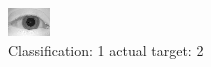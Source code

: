 \begin{figure}[h!]
\begin{center}
\includegraphics[width=0.60\columnwidth]{figures/ID1011_class_1_target_2.png}
\end{center}
\caption{ Classification: 1 actual target: 2}
\label{fig:ID1011_class_1_target_2}
\end{figure}
